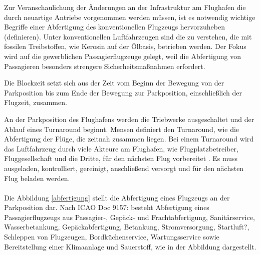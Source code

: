 
Zur Veranschaulichung der Änderungen an der Infrastruktur am Flughafen die durch neuartige Antriebe vorgenommen werden müssen, 
ist es notwendig wichtige Begriffe einer Abfertigung des konventionellen Flugzeugs hervorzuheben (definieren). 
Unter konventionellen Luftfahrzeugen sind die zu verstehen,
die mit fossilen Treibstoffen, wie Kerosin auf der Ölbasis, betrieben werden. Der Fokus wird auf die gewerblichen Passagierflugzeuge gelegt,
weil die Abfertigung von Passagieren besonders strengere Sicherheitsmaßnahmen erfordert.


Die Blockzeit setzt sich aus der Zeit vom Beginn der Bewegung von der Parkposition bis zum Ende der Bewegung zur Parkposition, 
einschließlich der Flugzeit, zusammen.

An der Parkposition des Flughafens werden die Triebwerke ausgeschaltet und der Ablauf eines Turnaround beginnt. 
Mensen \cite{mensen2013handbuch} definiert den Turnaround, wie die Abfertigung der Flüge, die zeitnah zusammen liegen.
Bei einem Turnaround wird das Luftfahrzeug durch viele Akteure am Flughafen, wie Flugplatzbetreiber, Fluggesellschaft und die Dritte, für 
den nächsten Flug vorbereitet \cite{mensen2013handbuch}. Es muss ausgeladen, kontrolliert, gereinigt, anschließend versorgt 
und für den nächsten Flug beladen werden. \\
\\
Die Abbildung \ref{abfertigung} stellt die Abfertigung eines Flugzeugs an der Parkposition dar.
Nach ICAO Doc 9157: besteht Abfertigung eines Passagierflugzeugs aus Passagier-, Gepäck- und Frachtabfertigung, 
Sanitärservice, Wasserbetankung, Gepäckabfertigung, Betankung, Stromversorgung,
Startluft?, Schleppen von Flugzeugen, Bordküchenservice, Wartungsservice sowie Bereitstellung einer Klimaanlage und Sauerstoff,
wie in der Abbildung dargestellt.

